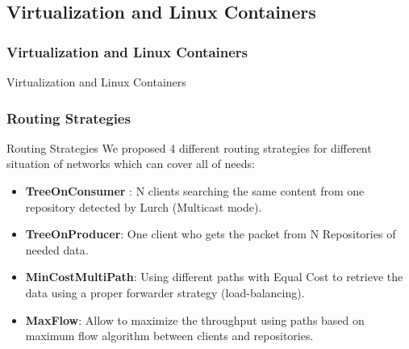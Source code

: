 \documentclass[8pt]{beamer}
\newcommand{\1}{\mathbbm 1}
\begin{document}
\subsection{Virtualization and Linux Containers}

\subsubsection{Virtualization and Linux Containers}

\begin{frame}{Virtualization and Linux Containers}

\end{frame}

\subsubsection{Routing Strategies}
\begin{frame}{Routing Strategies}
We proposed 4 different routing strategies for different situation of networks which can cover all of needs:
\begin{itemize}

\item \textbf{TreeOnConsumer} : N clients searching the same content from one repository detected by Lurch (Multicast mode).

\item \textbf{TreeOnProducer}: One client who gets the packet from N Repositories of needed data.

\item \textbf{MinCostMultiPath}: Using different paths with Equal Cost to retrieve the data using a proper forwarder strategy (load-balancing).

\item \textbf{MaxFlow}: Allow to maximize the throughput using paths based on maximum flow algorithm between clients and repositories.

\end{itemize}
\end{frame}
\end{document}
